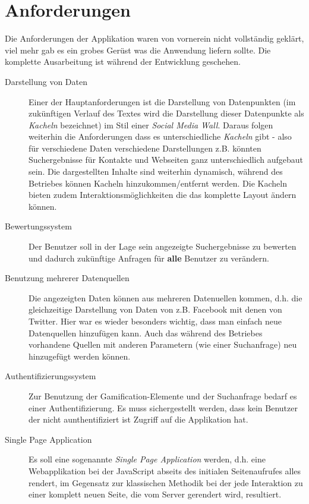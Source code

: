 \documentclass[12pt,twoside]{book}
\begin{document}
\section{Anforderungen}

Die Anforderungen der Applikation waren von vornerein nicht vollständig geklärt, viel mehr gab es ein grobes Gerüst was die Anwendung liefern sollte. Die komplette Ausarbeitung ist während der Entwicklung geschehen.

\begin{description}

\item[Darstellung von Daten]

  Einer der Hauptanforderungen ist die Darstellung von Datenpunkten (im zukünftigen Verlauf des Textes wird die Darstellung dieser Datenpunkte als \textit{Kacheln} bezeichnet) im Stil einer \textit{Social Media Wall}. Daraus folgen weiterhin die Anforderungen dass es unterschiedliche \textit{Kacheln} gibt - also für verschiedene Daten verschiedene Darstellungen z.B. könnten Suchergebnisse für Kontakte und Webseiten ganz unterschiedlich aufgebaut sein. Die dargestellten Inhalte sind weiterhin dynamisch, während des Betriebes können Kacheln hinzukommen/entfernt werden. Die Kacheln bieten zudem Interaktionsm\"oglichkeiten die das komplette Layout \"andern k\"onnen.

\item[Bewertungssystem]

  Der Benutzer soll in der Lage sein angezeigte Suchergebnisse zu bewerten und dadurch zukünftige Anfragen für \textbf{alle} Benutzer zu verändern.

\item[Benutzung mehrerer Datenquellen]
  Die angezeigten Daten können aus mehreren Datenuellen kommen, d.h. die gleichzeitige Darstellung von Daten von z.B. Facebook mit denen von Twitter. Hier war es wieder besonders wichtig, dass man einfach neue Datenquellen hinzufügen kann. Auch das während des Betriebes vorhandene Quellen mit anderen Parametern (wie einer Suchanfrage) neu hinzugefügt werden k\"onnen.

\item[Authentifizierungssystem]
	Zur Benutzung der Gamification-Elemente und der Suchanfrage bedarf es einer Authentifizierung. Es muss sichergestellt werden, dass kein Benutzer der nicht aunthentifiziert ist Zugriff auf die Applikation hat.

\item[Single Page Application]
  Es soll eine sogenannte \textit{Single Page Application} werden, d.h. eine Webapplikation bei der JavaScript abseits des initialen Seitenaufrufes alles rendert, im Gegensatz zur klassischen Methodik bei der jede Interaktion zu einer komplett neuen Seite, die vom Server gerendert wird, resultiert.


\end{description}
\end{document}
